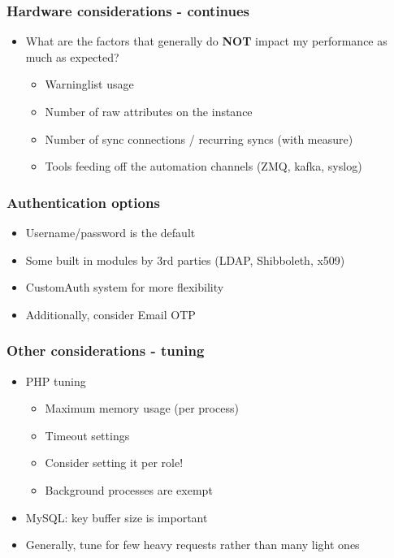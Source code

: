 \begin{frame}
\frametitle{Hardware considerations - continues}
    \begin{itemize}
        \item What are the factors that generally do {\bf NOT} impact my performance as much as expected?
        \begin{itemize}
            \item Warninglist usage
            \item Number of raw attributes on the instance
            \item Number of sync connections / recurring syncs (with measure)
            \item Tools feeding off the automation channels (ZMQ, kafka, syslog)
        \end{itemize}
    \end{itemize}
\end{frame}

\begin{frame}
\frametitle{Authentication options}
    \begin{itemize}
        \item Username/password is the default
        \item Some built in modules by 3rd parties (LDAP, Shibboleth, x509)
        \item CustomAuth system for more flexibility
        \item Additionally, consider Email OTP
    \end{itemize}
\end{frame}

\begin{frame}
\frametitle{Other considerations - tuning}
    \begin{itemize}
        \item PHP tuning
        \begin{itemize}
            \item Maximum memory usage (per process)
            \item Timeout settings
            \item Consider setting it per role!
            \item Background processes are exempt
        \end{itemize}
        \item MySQL: key buffer size is important
        \item Generally, tune for few heavy requests rather than many light ones
    \end{itemize}
\end{frame}

